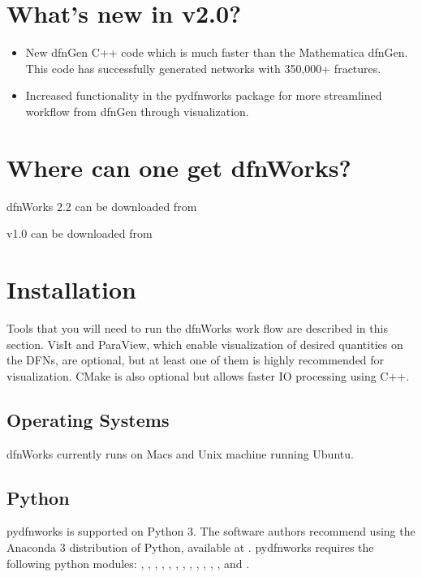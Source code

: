 \documentclass[letterpaper,10pt,english]{sphinxmanual}
\begin{document}
\section{What’s new in v2.0?}
\label{\detokenize{intro:what-s-new-in-v2-0}}\begin{itemize}
\item {} 
New dfnGen C++ code which is much faster than the Mathematica dfnGen. This code has successfully generated networks with 350,000+ fractures.

\item {} 
Increased functionality in the pydfnworks package for more streamlined workflow from dfnGen through visualization.

\end{itemize}


\section{Where can one get dfnWorks?}
\label{\detokenize{intro:where-can-one-get-dfnworks}}
dfnWorks 2.2 can be downloaded from 

v1.0 can be downloaded from 


\section{Installation}
\label{\detokenize{intro:installation}}
Tools that you will need to run the dfnWorks work flow are described in
this section. VisIt and ParaView, which enable visualization of desired
quantities on the DFNs, are optional, but at least one of them is highly
recommended for visualization. CMake is also optional but allows faster IO
processing using C++.


\subsection{Operating Systems}
\label{\detokenize{intro:operating-systems}}
dfnWorks currently runs on Macs and Unix machine running Ubuntu.


\subsection{Python}
\label{\detokenize{intro:python}}
pydfnworks is supported on Python 3. The software authors recommend using
the Anaconda 3 distribution of Python, available at .
pydfnworks requires the following python modules: , , , ,  , , , , , , , , and .
\end{document}
